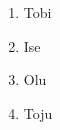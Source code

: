\documentclass{article}
\begin{document}
	\begin{enumerate}
		\item Tobi
		\item Ise
		\item Olu
		\item Toju

	\end{enumerate}
\end{document}
